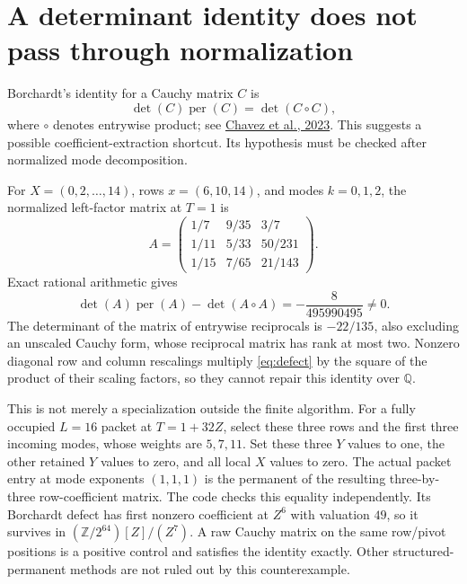 \documentclass[11pt]{article}
\begin{document}
\section{A determinant identity does not pass through normalization}
Borchardt's identity for a Cauchy matrix $C$ is
\[
 \det(C)\operatorname{per}(C)=\det(C\circ C),
\]
where $\circ$ denotes entrywise product; see
\href{https://arxiv.org/abs/2309.05886}{Chavez et al., 2023}.
This suggests a possible coefficient-extraction shortcut. Its hypothesis
must be checked after normalized mode decomposition.

For $X=(0,2,\ldots,14)$, rows $x=(6,10,14)$, and modes $k=0,1,2$,
the normalized left-factor matrix at $T=1$ is
\[
 A=\begin{pmatrix}
 1/7&9/35&3/7\\
 1/11&5/33&50/231\\
 1/15&7/65&21/143
 \end{pmatrix}.
\]
Exact rational arithmetic gives
\begin{equation}
 \det(A)\operatorname{per}(A)-\det(A\circ A)
 =-\frac8{495990495}\ne0.
 \label{eq:defect}
\end{equation}
The determinant of the matrix of entrywise reciprocals is $-22/135$,
also excluding an unscaled Cauchy form, whose reciprocal matrix has
rank at most two. Nonzero diagonal row and column rescalings multiply
\eqref{eq:defect} by the square of the product of their scaling factors,
so they cannot repair this identity over $\mathbb Q$.

This is not merely a specialization outside the finite algorithm.
For a fully occupied $L=16$ packet at $T=1+32Z$, select these three rows
and the first three incoming modes, whose weights are $5,7,11$.
Set these three $Y$ values to one, the other retained $Y$ values to zero,
and all local $X$ values to zero. The actual packet entry at mode
exponents $(1,1,1)$ is the permanent of the resulting three-by-three
row-coefficient matrix. The code checks this equality independently.
Its Borchardt defect has first nonzero coefficient at $Z^6$ with
valuation $49$, so it survives in
$(\mathbb Z/2^{64})[Z]/(Z^7)$.
A raw Cauchy matrix on the same row/pivot positions is a positive control
and satisfies the identity exactly. Other structured-permanent methods
are not ruled out by this counterexample.
\end{document}
